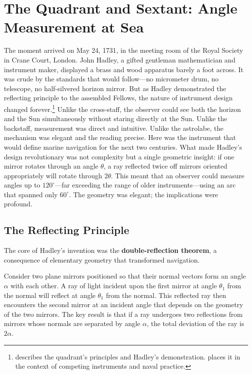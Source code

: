 \chapter{The Quadrant and Sextant: Angle Measurement at Sea}
\label{ch:quadrant-sextant}

The moment arrived on May 24, 1731, in the meeting room of the Royal Society in Crane Court, London. John Hadley, a gifted gentleman mathematician and instrument maker, displayed a brass and wood apparatus barely a foot across. It was crude by the standards that would follow—no micrometer drum, no telescope, no half-silvered horizon mirror. But as Hadley demonstrated the reflecting principle to the assembled Fellows, the nature of instrument design changed forever.\footnote{\textcite{Hadley1731} describes the quadrant's principles and Hadley's demonstration. \textcite{Bennett2010} places it in the context of competing instruments and naval practice.} Unlike the cross-staff, the observer could see both the horizon and the Sun simultaneously without staring directly at the Sun. Unlike the backstaff, measurement was direct and intuitive. Unlike the astrolabe, the mechanism was elegant and the reading precise. Here was the instrument that would define marine navigation for the next two centuries. What made Hadley's design revolutionary was not complexity but a single geometric insight: if one mirror rotates through an angle $\theta$, a ray reflected twice off mirrors oriented appropriately will rotate through $2\theta$. This meant that an observer could measure angles up to $120^{\circ}$—far exceeding the range of older instruments—using an arc that spanned only $60^{\circ}$. The geometry was elegant; the implications were profound.

\section{The Reflecting Principle}

The core of Hadley's invention was the \textbf{double-reflection theorem}, a consequence of elementary geometry that transformed navigation.

Consider two plane mirrors positioned so that their normal vectors form an angle $\alpha$ with each other. A ray of light incident upon the first mirror at angle $\theta_1$ from the normal will reflect at angle $\theta_1$ from the normal. This reflected ray then encounters the second mirror at an incident angle that depends on the geometry of the two mirrors. The key result is that if a ray undergoes two reflections from mirrors whose normals are separated by angle $\alpha$, the total deviation of the ray is $2\alpha$.

